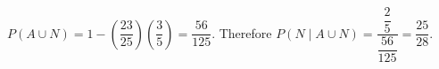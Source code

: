 $P(A\cup N)=1-(\dfrac{23}{25})(\dfrac{3}{5})=\dfrac{56}{125}$. Therefore $P(N\mid A\cup N)=\dfrac{\dfrac{2}{5}}{\dfrac{56}{125}}=\boxed{\dfrac{25}{28}}$.
